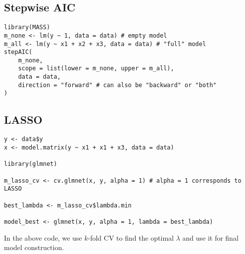 \documentclass[titlepage, 12pt, leqno]{article}
\begin{document}
\subsection{Stepwise AIC}
\begin{verbatim}
library(MASS)
m_none <- lm(y ~ 1, data = data) # empty model
m_all <- lm(y ~ x1 + x2 + x3, data = data) # "full" model
stepAIC(
    m_none, 
    scope = list(lower = m_none, upper = m_all), 
    data = data,
    direction = "forward" # can also be "backward" or "both"
)
\end{verbatim}

\subsection{LASSO}
\begin{verbatim}
y <- data$y
x <- model.matrix(y ~ x1 + x1 + x3, data = data)

library(glmnet)

m_lasso_cv <- cv.glmnet(x, y, alpha = 1) # alpha = 1 corresponds to LASSO

best_lambda <- m_lasso_cv$lambda.min

model_best <- glmnet(x, y, alpha = 1, lambda = best_lambda)
\end{verbatim}
\begin{note}
    In the above code, we use $k$-fold CV to find the optimal $\lambda$ and use
    it for final model construction.
\end{note}
\end{document}
